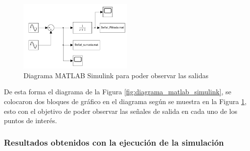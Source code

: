 \begin{figure}[h!]
    \centering
    \includegraphics[width=0.5\textwidth]{fig/especifico_2/CASO_ESTUDIO_FILTRO/Diagrama matlab simulink scope.pdf}
    \caption{Diagrama MATLAB Simulink para poder observar las salidas}
    \label{fig:diagrama_matlab_simulink_graficos}
\end{figure}

De esta forma el diagrama de la Figura \ref{fig:diagrama_matlab_simulink}, se colocaron dos bloques de gráfico en el diagrama según se muestra en la Figura \ref{fig:diagrama_matlab_simulink_graficos}, esto con el objetivo de poder observar las señales de salida en cada uno de los puntos de interés.


\newpage

\subsubsection{Resultados obtenidos con la ejecución de la simulación}


